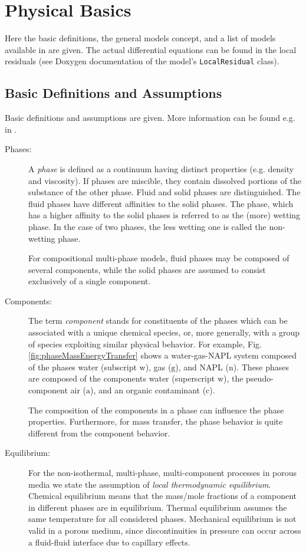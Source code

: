 \section{Physical Basics}
Here the basic definitions, the general models concept, and a list of
models available in \Dumux are given. The actual differential equations
can be found in the local residuals (see Doxygen documentation of the
model's \texttt{LocalResidual} class).

\subsection{Basic Definitions and Assumptions}
Basic definitions and assumptions are given. More information can be found e.g. in \cite{A3:acosta:2006,A3:bielinski:2006}.

\begin{description}
\item[Phases:]
A \emph{phase} is defined as a continuum having distinct properties (e.g. density and viscosity). If phases are miscible, they contain dissolved portions of the substance of the other phase. 
Fluid and solid phases are distinguished. The fluid phases have different affinities to the solid phases. The phase, which has a higher affinity to the solid phases is referred to as the (more) wetting phase. In the case of two phases, the less wetting one is called the non-wetting phase. 

For compositional multi-phase models, fluid phases may be composed of several components, while the solid phases are assumed to consist exclusively of a single component. 

\item[Components:]
The term \emph{component} stands for constituents of the phases which
can be associated with a unique chemical species, or, more generally, with
a group of species exploiting similar physical behavior. For example, Fig. \ref{fig:phaseMassEnergyTransfer} shows a water-gas-NAPL system composed of the phases water (subscript
$\text{w}$), gas ($\text{g}$), and NAPL ($\text{n}$). These phases are
composed of the components water (superscript $\text{w}$), the pseudo-component
air ($\text{a}$), and an organic contaminant ($\text{c}$).

The composition of the components in a phase can influence the phase properties. Furthermore, for mass transfer, the phase behavior is quite different from the component behavior.

\item[Equilibrium:]
For the non-isothermal, multi-phase, multi-component processes in porous media
we state the assumption of \emph{local thermodynamic equilibrium}.
Chemical equilibrium means that the mass/mole fractions of a component in
different phases are in equilibrium.
Thermal equilibrium assumes the same temperature for all considered phases.
Mechanical equilibrium is not valid in a porous medium, since discontinuities
in pressure can occur across a fluid-fluid interface due to capillary effects.


\end{description}
